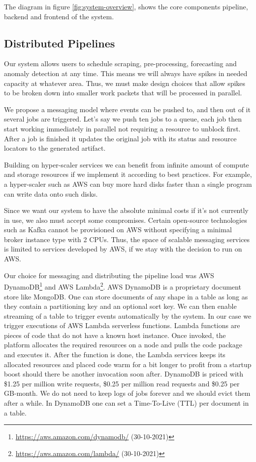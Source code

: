 The diagram in figure \ref{fig:system-overview}, shows the core components pipeline, backend and frontend of the system.


\subsection{Distributed Pipelines}

Our system allows users to schedule scraping, pre-processing, forecasting and anomaly detection at any time. This means we will always have spikes in needed capacity at whatever area. Thus, we must make design choices that allow spikes to be broken down into smaller work packets that will be processed in parallel.

We propose a messaging model where events can be pushed to, and then out of it several jobs are triggered. Let's say we push ten jobs to a queue, each job then start working immediately in parallel not requiring a resource to unblock first. After a job is finished it updates the original job with its status and resource locators to the generated artifact.

Building on hyper-scaler services we can benefit from infinite amount of compute and storage resources if we implement it according to best practices. For example, a hyper-scaler such as AWS can buy more hard disks faster than a single program can write data onto such disks.

Since we want our system to have the absolute minimal costs if it's not currently in use, we also must accept some compromises. Certain open-source technologies such as Kafka cannot be provisioned on AWS without specifying a minimal broker instance type with 2 CPUs. Thus, the space of scalable messaging services is limited to services developed by AWS, if we stay with the decision to run on AWS.

Our choice for messaging and distributing the pipeline load was AWS DynamoDB\footnote{\url{https://aws.amazon.com/dynamodb/} (30-10-2021)} and AWS Lambda\footnote{\url{https://aws.amazon.com/lambda/} (30-10-2021)}. AWS DynamoDB is a proprietary document store like MongoDB. One can store documents of any shape in a table as long as they contain a partitioning key and an optional sort key. We can then enable streaming of a table to trigger events automatically by the system. In our case we trigger executions of AWS Lambda serverless functions. Lambda functions are pieces of code that do not have a known host instance. Once invoked, the platform allocates the required resources on a node and pulls the code package and executes it. After the function is done, the Lambda services keeps its allocated resources and placed code warm for a bit longer to profit from a startup boost should there be another invocation soon after. 
DynamoDB is priced with \$1.25 per million write requests, \$0.25 per million read requests and \$0.25 per GB-month. We do not need to keep logs of jobs forever and we should evict them after a while. In DynamoDB one can set a Time-To-Live (TTL) per document in a table.

